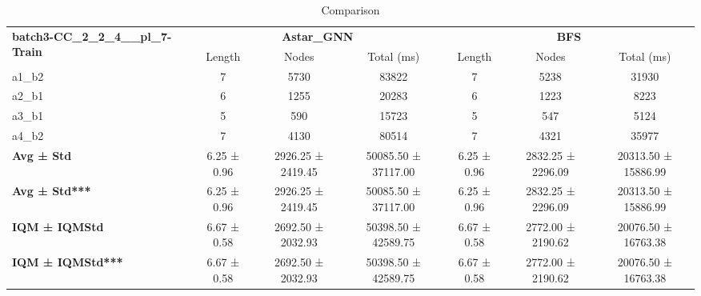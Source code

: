 \begin{table}[!ht]
\centering
\small
\begin{tabular}{l|ccc|ccc}
\multirow{2}{*}{\textbf{batch3-CC\_2\_2\_4\_\_pl\_7-Train}} & \multicolumn{3}{c|}{\textbf{Astar\_GNN}} & \multicolumn{3}{c}{\textbf{BFS}} \\
\cline{2-7}
& Length & Nodes & Total (ms) & Length & Nodes & Total (ms) \\
\hline
a1\_b2 & 7 & 5730 & 83822 & 7 & 5238 & 31930 \\
a2\_b1 & 6 & 1255 & 20283 & 6 & 1223 & 8223 \\
a3\_b1 & 5 & 590 & 15723 & 5 & 547 & 5124 \\
a4\_b2 & 7 & 4130 & 80514 & 7 & 4321 & 35977 \\
\hline
\textbf{Avg ± Std} & 6.25 ± 0.96 & 2926.25 ± 2419.45 & 50085.50 ± 37117.00 & 6.25 ± 0.96 & 2832.25 ± 2296.09 & 20313.50 ± 15886.99 \\
\textbf{Avg ± Std***} & 6.25 ± 0.96 & 2926.25 ± 2419.45 & 50085.50 ± 37117.00 & 6.25 ± 0.96 & 2832.25 ± 2296.09 & 20313.50 ± 15886.99 \\
\textbf{IQM ± IQMStd} & 6.67 ± 0.58 & 2692.50 ± 2032.93 & 50398.50 ± 42589.75 & 6.67 ± 0.58 & 2772.00 ± 2190.62 & 20076.50 ± 16763.38 \\
\textbf{IQM ± IQMStd***} & 6.67 ± 0.58 & 2692.50 ± 2032.93 & 50398.50 ± 42589.75 & 6.67 ± 0.58 & 2772.00 ± 2190.62 & 20076.50 ± 16763.38 \\
\end{tabular}
\caption{Comparison}
\label{tab:batch3_CC_2_2_4__pl_7_comparison_train}
\end{table}
